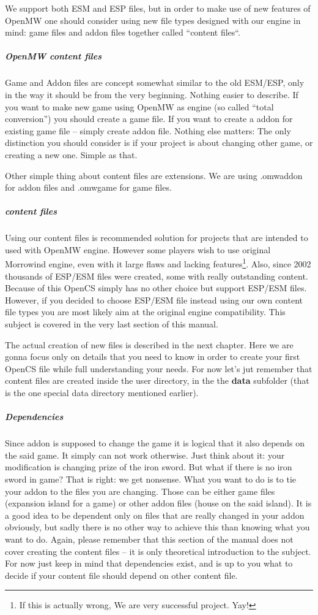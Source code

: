 We support both ESM and ESP files, but in order to make use of new features of OpenMW one should consider using new file types designed
with our engine in mind: game files and addon files together called ``content files``.

\subparagraph{Open{MW} content files}
Game and Addon files are concept somewhat similar to the old ESM/ESP, only in the way it should be from the very beginning. Nothing easier
to describe. If you want to make new game using Open{MW} as engine (so called ``total conversion'') you should create a game file.
If you want to create a addon for existing game file -- simply create addon file. Nothing else matters: The only distinction you should
consider is if your project is about changing other game, or creating a new one. Simple as that.

Other simple thing about content files are extensions. We are using .omwaddon for addon files and .omwgame for game files.

\subparagraph{\MW content files}
Using our content files is recommended solution for projects that are intended to used with Open{MW} engine. However some players
wish to use original Morrowind engine, even with it large flaws and lacking features\footnote{If this is actually wrong, We are very
successful project. Yay!}. Also, since 2002 thousands of ESP/ESM files were created, some with really outstanding content.
Because of this Open{CS} simply has no other choice but support ESP/ESM files. However, if you decided to choose ESP/ESM file instead
using our own content file types you are most likely aim at the original engine compatibility. This subject is covered in the very
last section of this manual. %

The actual creation of new files is described in the next chapter. Here we are gonna focus only on details that you need to know
in order to create your first Open{CS} file while full understanding your needs. For now let's jut remember that content files
are created inside the user directory, in the the \textbf{data} subfolder (that is the one special data directory mentioned earlier).

\subparagraph{Dependencies}
Since addon is supposed to change the game it is logical that it also depends on the said game. It simply can not work otherwise.
Just think about it: your modification is changing prize of the iron sword. But what if there is no iron sword in game? That is right:
we get nonsense. What you want to do is to tie your addon to the files you are changing. Those can be either game files (expansion island
for a game) or other addon files (house on the said island). It is a good idea to be dependent only on files that are really changed
in your addon obviously, but sadly there is no other way to achieve this than knowing what you want to do. Again, please remember that
this section of the manual does not cover creating the content files -- it is only theoretical introduction to the subject. For now just
keep in mind that dependencies exist, and is up to you what to decide if your content file should depend on other content file.

